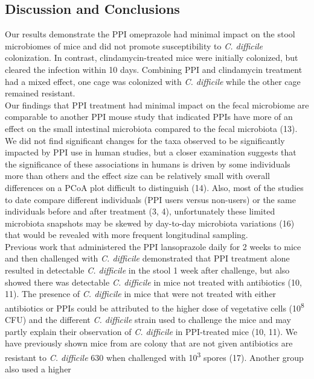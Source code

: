 \documentclass[11pt,]{article}
\begin{document}
\subsection{Discussion and
Conclusions}\label{discussion-and-conclusions}

Our results demonstrate the PPI omeprazole had minimal impact on the
stool microbiomes of mice and did not promote susceptibility to \emph{C.
difficile} colonization. In contrast, clindamycin-treated mice were
initially colonized, but cleared the infection within 10 days. Combining
PPI and clindamycin treatment had a mixed effect, one cage was colonized
with \emph{C. difficile} while the other cage remained resistant.\\
Our findings that PPI treatment had minimal impact on the fecal
microbiome are comparable to another PPI mouse study that indicated PPIs
have more of an effect on the small intestinal microbiota compared to
the fecal microbiota (13). We did not find significant changes for the
taxa observed to be significantly impacted by PPI use in human studies,
but a closer examination suggests that the significance of these
associations in humans is driven by some individuals more than others
and the effect size can be relatively small with overall differences on
a PCoA plot difficult to distinguish (14). Also, most of the studies to
date compare different individuals (PPI users versus non-users) or the
same individuals before and after treatment (3, 4), unfortunately these
limited microbiota snapshots may be skewed by day-to-day microbiota
variations (16) that would be revealed with more frequent longitudinal
sampling.\\
Previous work that administered the PPI lansoprazole daily for 2 weeks
to mice and then challenged with \emph{C. difficile} demonstrated that
PPI treatment alone resulted in detectable \emph{C. difficile} in the
stool 1 week after challenge, but also showed there was detectable
\emph{C. difficile} in mice not treated with antibiotics (10, 11). The
presence of \emph{C. difficile} in mice that were not treated with
either antibiotics or PPIs could be attributed to the higher dose of
vegetative cells (10\textsuperscript{8} CFU) and the different \emph{C.
difficile} strain used to challenge the mice and may partly explain
their observation of \emph{C. difficile} in PPI-treated mice (10, 11).
We have previously shown mice from are colony that are not given
antibiotics are resistant to \emph{C. difficile} 630 when challenged
with 10\textsuperscript{3} spores (17). Another group also used a higher
\end{document}

